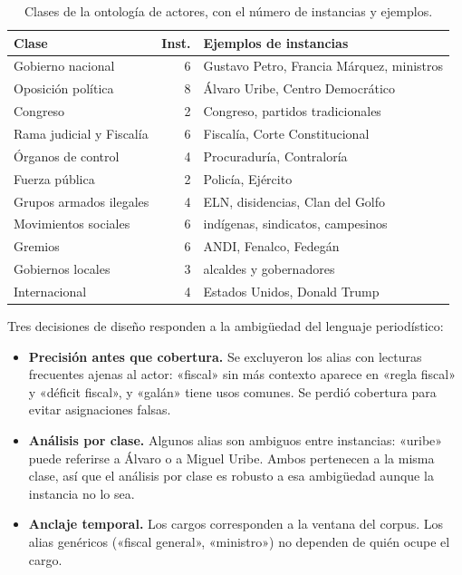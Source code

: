 \documentclass[10pt,twocolumn]{article}
\begin{document}
\begin{table}[t]
\centering\small
\caption{Clases de la ontología de actores, con el número de instancias y
ejemplos.}
\label{tab:ontologia}
\begin{tabular}{p{2.7cm} r p{3.6cm}}
\toprule
Clase & Inst. & Ejemplos de instancias\\
\midrule
Gobierno nacional       & 6 & Gustavo Petro, Francia Márquez, ministros\\
Oposición política      & 8 & Álvaro Uribe, Centro Democrático\\
Congreso                & 2 & Congreso, partidos tradicionales\\
Rama judicial y Fiscalía & 6 & Fiscalía, Corte Constitucional\\
Órganos de control      & 4 & Procuraduría, Contraloría\\
Fuerza pública          & 2 & Policía, Ejército\\
Grupos armados ilegales & 4 & ELN, disidencias, Clan del Golfo\\
Movimientos sociales    & 6 & indígenas, sindicatos, campesinos\\
Gremios                 & 6 & ANDI, Fenalco, Fedegán\\
Gobiernos locales       & 3 & alcaldes y gobernadores\\
Internacional           & 4 & Estados Unidos, Donald Trump\\
\bottomrule
\end{tabular}
\end{table}

Tres decisiones de diseño responden a la ambigüedad del lenguaje periodístico:

\begin{itemize}
\item \textbf{Precisión antes que cobertura.} Se excluyeron los alias con
lecturas frecuentes ajenas al actor: «fiscal» sin más contexto aparece en
«regla fiscal» y «déficit fiscal», y «galán» tiene usos comunes. Se perdió
cobertura para evitar asignaciones falsas.
\item \textbf{Análisis por clase.} Algunos alias son ambiguos entre instancias:
«uribe» puede referirse a Álvaro o a Miguel Uribe. Ambos pertenecen a la
misma clase, así que el análisis por clase es robusto a esa ambigüedad aunque
la instancia no lo sea.
\item \textbf{Anclaje temporal.} Los cargos corresponden a la ventana del
corpus. Los alias genéricos («fiscal general», «ministro») no dependen de
quién ocupe el cargo.
\end{itemize}
\end{document}
